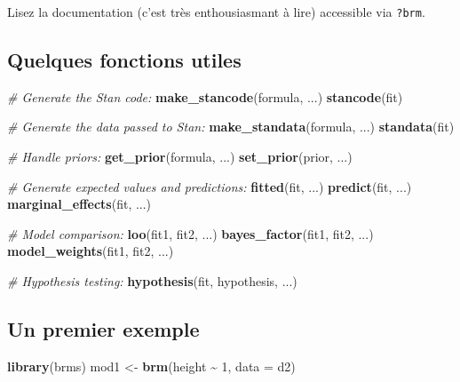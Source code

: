 \documentclass[
  a4paper,11pt,twoside,onecolumn,openright,final,oldfontcommands]{memoir}
\newenvironment{Shaded}{\begin{snugshade}}{\end{snugshade}}
\newcommand{\CommentTok}[1]{\textcolor[rgb]{0.56,0.35,0.01}{\textit{#1}}}
\newcommand{\DataTypeTok}[1]{\textcolor[rgb]{0.13,0.29,0.53}{#1}}
\newcommand{\DecValTok}[1]{\textcolor[rgb]{0.00,0.00,0.81}{#1}}
\newcommand{\KeywordTok}[1]{\textcolor[rgb]{0.13,0.29,0.53}{\textbf{#1}}}
\newcommand{\NormalTok}[1]{#1}
\newcommand{\OperatorTok}[1]{\textcolor[rgb]{0.81,0.36,0.00}{\textbf{#1}}}
\newcommand{\StringTok}[1]{\textcolor[rgb]{0.31,0.60,0.02}{#1}}
\theoremstyle{definition}
\theoremstyle{definition}
\theoremstyle{definition}
\theoremstyle{remark}
\begin{document}
Lisez la documentation (c'est très enthousiasmant à lire) accessible via \texttt{?brm}.

\hypertarget{quelques-fonctions-utiles}{%
\subsection{Quelques fonctions utiles}\label{quelques-fonctions-utiles}}

\begin{Shaded}
\begin{Highlighting}[]
\CommentTok{\# Generate the Stan code:}
\KeywordTok{make\_stancode}\NormalTok{(formula, ...)}
\KeywordTok{stancode}\NormalTok{(fit)}

\CommentTok{\# Generate the data passed to Stan:}
\KeywordTok{make\_standata}\NormalTok{(formula, ...)}
\KeywordTok{standata}\NormalTok{(fit)}

\CommentTok{\# Handle priors:}
\KeywordTok{get\_prior}\NormalTok{(formula, ...)}
\KeywordTok{set\_prior}\NormalTok{(prior, ...)}

\CommentTok{\# Generate expected values and predictions:}
\KeywordTok{fitted}\NormalTok{(fit, ...)}
\KeywordTok{predict}\NormalTok{(fit, ...)}
\KeywordTok{marginal\_effects}\NormalTok{(fit, ...)}

\CommentTok{\# Model comparison:}
\KeywordTok{loo}\NormalTok{(fit1, fit2, ...)}
\KeywordTok{bayes\_factor}\NormalTok{(fit1, fit2, ...)}
\KeywordTok{model\_weights}\NormalTok{(fit1, fit2, ...)}

\CommentTok{\# Hypothesis testing:}
\KeywordTok{hypothesis}\NormalTok{(fit, hypothesis, ...)}
\end{Highlighting}
\end{Shaded}

\hypertarget{un-premier-exemple}{%
\subsection{Un premier exemple}\label{un-premier-exemple}}

\begin{Shaded}
\begin{Highlighting}[]
\KeywordTok{library}\NormalTok{(brms)}
\NormalTok{mod1 \textless{}{-}}\StringTok{ }\KeywordTok{brm}\NormalTok{(height }\OperatorTok{\textasciitilde{}}\StringTok{ }\DecValTok{1}\NormalTok{, }\DataTypeTok{data =}\NormalTok{ d2)}
\end{Highlighting}
\end{Shaded}
\end{document}
